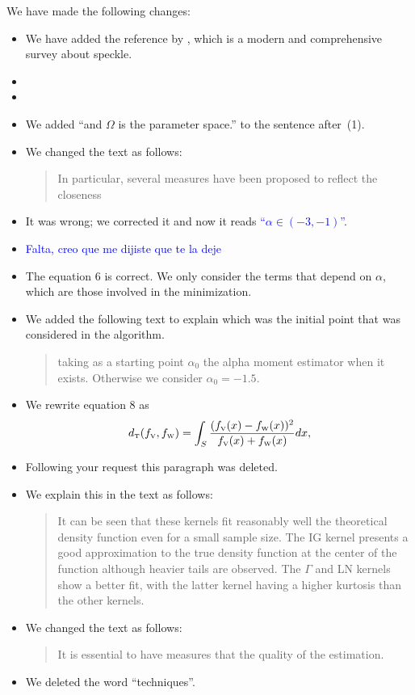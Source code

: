 \documentclass{ar2rc}
\begin{document}
\AR We have made the following changes:
\begin{itemize}
\item We have added the reference by \citet{SARImageStatisticalModelingPartISinglePixelStatisticalModels}, which is a modern and comprehensive survey about speckle.
\item 
\item 
\item We added ``and $\Omega$ is the parameter space.'' to the sentence after~(1).
\item We changed the text as follows:
		\begin{quote}
	In particular, several measures have been proposed to reflect the closeness  \DIFdelbegin {} \DIFdelend \DIFaddbegin {}\DIFaddend
		\end{quote}
\item It was wrong; we corrected it and now it reads \textcolor{blue}{``$\alpha \in (-3,-1)$''}.
\item \textcolor{blue}{Falta, creo que me dijiste que te la deje}
\item The equation $6$ is correct. We only consider the terms that depend on $\alpha$, which are those involved in the minimization.
\item We added the following text to explain which was the initial point that was considered in the algorithm.
\begin{quote}
	taking as a starting point $\alpha_0$ the alpha moment estimator when it exists. Otherwise we consider $\alpha_0=-1.5$.
\end{quote}
\item We rewrite equation $8$ as 
\begin{equation}
	d_{\text{\tiny{T}}}(f_{\text{\tiny{V}}},f_{\text{\tiny{W}}})=\int_{S}\frac{(f_{\text{\tiny{V}}}(x)-f_{\text{\tiny{W}}}(x))^2}{f_{\text{\tiny{V}}}(x)+f_{\text{\tiny{W}}}(x)}dx,
	\label{DT}
\end{equation}

\item Following your request this paragraph was deleted.
\item We explain this in the text as follows:
\begin{quote}
	It can be seen that these kernels fit reasonably well the theoretical density function even for a small sample size. The IG kernel presents a good approximation to the true density function at the center of the function although heavier tails are observed. The $\Gamma$ and LN kernels show a better fit, with the latter kernel having a higher kurtosis than the other kernels.
\end{quote}
\item We changed the text as follows:
	\begin{quote}		
	It is essential to have measures that \DIFdelbegin {} \DIFdelend \DIFaddbegin {}\DIFaddend the quality of the estimation. 
	\end{quote}
\item We deleted the word ``techniques''.
\end{itemize}



	
\end{document}
